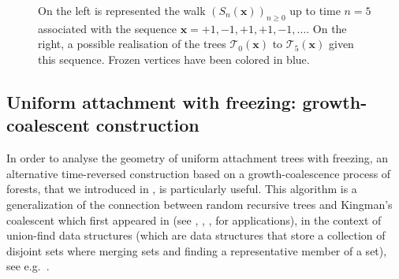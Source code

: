 \documentclass[11pt]{article}
\theoremstyle{plain}
\theoremstyle{definition}
\theoremstyle{remark}
\newcommand{\1}{\mathbbm{1}} %
\newcommand{\T}{\mathcal{T}} %
\newcommand{\Xb}{\mathrm{\mathbf{x}}} %
\begin{document}
\begin{figure}
\begin{center}
\caption{On the left is represented the walk $(S_n(\Xb))_{n \geq 0}$ up to time $n=5$ associated with the sequence $\Xb=+1,-1,+1,+1,-1,\dots$. On the right, a possible realisation of the trees $\T_0(\Xb)$ to $\T_5(\Xb)$ given this sequence. Frozen vertices have been colored in blue.}
\label{fig exemple arbre recursif avec gel}
\end{center}
\end{figure}


\subsection{Uniform attachment with freezing: growth-coalescent construction}
\label{ssec:growthcoalescent}

In order to analyse the geometry of uniform attachment trees with freezing,  an alternative time-reversed construction based on a growth-coalescence process of forests, that we introduced in \cite{BBKK23+}, is particularly useful. This algorithm is a generalization of the connection between random recursive trees and Kingman's coalescent which first appeared in \cite{DR76} (see \cite[Sec.~6]{Dev87}, \cite[Sec.~3]{Pit94}, \cite[Sec.~2.2]{AB15},  {\cite{ABE18,Esl21,Esl22}} for applications), in the context of union-find data structures (which are data structures that store a collection of disjoint sets where merging sets and finding a representative member of a set), see e.g.~\cite{KS78}.
\end{document}
